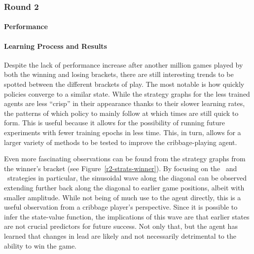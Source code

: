 
\subsubsection*{Round 2}
\label{sec:findings-r2}

\paragraph*{Performance}
\label{sec:findings-r2-perf}








\paragraph*{Learning Process and Results}
\label{sec:findings-r2-results}




Despite the lack of performance increase after another million games played by
both the winning and losing brackets,
there are still interesting trends to be spotted between the different brackets
of play.
%
The most notable is how quickly policies converge to a similar state.
%
While the strategy graphs for the less trained agents are less ``crisp''
in their appearance thanks to their slower learning rates,
the patterns of which policy to mainly follow at which times
are still quick to form.
%
This is useful because it allows for the possibility of running future
experiments with fewer training epochs in less time.
%
This, in turn, allows for a larger variety of methods to be tested to improve
the cribbage-playing agent.

Even more fascinating observations can be found from the strategy graphs
from the winner's bracket (see Figure~\ref{r2-strats-winner}).
%
By focusing on the \handmaxmin\ and \handmaxavg\ strategies in particular,
the sinusoidal wave along the diagonal can be observed extending further
back along the diagonal to earlier game positions,
albeit with smaller amplitude.
%
While not being of much use to the agent directly,
this is a useful observation from a cribbage player's perspective.
%
Since it is possible to infer the state-value function,
the implications of this wave are that earlier states are not crucial
predictors for future success.
%
Not only that,
but the agent has learned that changes in lead are likely and not necessarily
detrimental to the ability to win the game.

